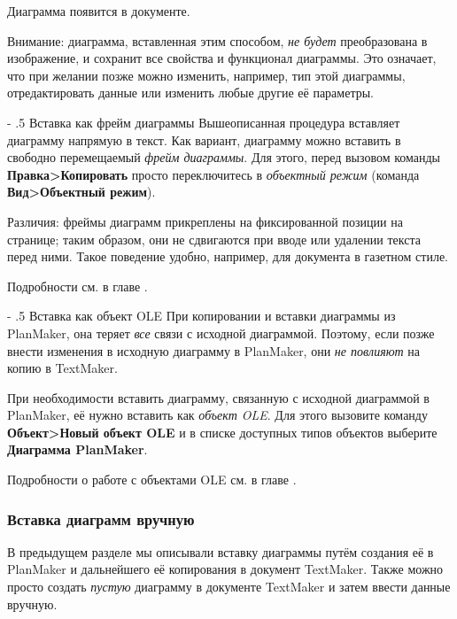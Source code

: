 ﻿\documentclass[a4paper,10pt]{article}
\makeatletter
\renewcommand\paragraph{%
   \@startsection{paragraph}{4}{0mm}%
      {-\baselineskip}%
      {.5\baselineskip}%
      {\normalfont\normalsize\bfseries}}
\makeatother
\begin{document}
Диаграмма появится в документе.

Внимание: диаграмма, вставленная этим способом, \textit{не будет} преобразована в изображение, и сохранит все свойства и функционал диаграммы. Это означает, что при желании позже можно изменить, например, тип этой диаграммы, отредактировать данные или изменить любые другие её параметры.

\paragraph{Вставка как фрейм диаграммы}
Вышеописанная процедура вставляет диаграмму напрямую в текст. Как вариант, диаграмму можно вставить в свободно перемещаемый \textit{фрейм диаграммы}. Для этого, перед вызовом команды \textbf{Правка>Копировать} просто переключитесь в \textit{объектный режим} (команда \textbf{Вид>Объектный режим}).

Различия: фреймы диаграмм прикреплены на фиксированной позиции на странице; таким образом, они не сдвигаются при вводе или удалении текста перед ними. Такое поведение удобно, например, для документа в газетном стиле.

Подробности см. в главе .

\paragraph{Вставка как объект OLE}
При копировании и вставки диаграммы из PlanMaker, она теряет \textit{все} связи с исходной диаграммой. Поэтому, если позже внести изменения в исходную диаграмму в PlanMaker, они \textit{не повлияют} на копию в TextMaker.

При необходимости вставить диаграмму, связанную с исходной диаграммой в PlanMaker, её нужно вставить как \textit{объект OLE}. Для этого вызовите команду \textbf{Объект>Новый объект OLE} и в списке доступных типов объектов выберите \textbf{Диаграмма PlanMaker}.

Подробности о работе с объектами OLE см. в главе .

 \subsubsection{Вставка диаграмм вручную}
 В предыдущем разделе мы описывали вставку диаграммы путём создания её в PlanMaker и дальнейшего её копирования в документ TextMaker. Также можно просто создать \textit{пустую} диаграмму в документе TextMaker и затем ввести данные вручную.
 
\end{document}
